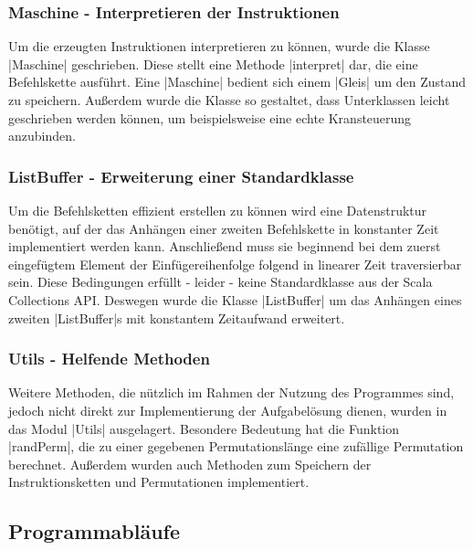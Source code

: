 \subsubsection{Maschine - Interpretieren der Instruktionen}
Um die erzeugten Instruktionen interpretieren zu können, wurde die Klasse |Maschine| geschrieben.
Diese stellt eine Methode |interpret| dar, die eine Befehlskette ausführt.
Eine |Maschine| bedient sich einem |Gleis| um den Zustand zu speichern.
Außerdem wurde die Klasse so gestaltet, dass Unterklassen leicht geschrieben werden können, um beispielsweise eine echte Kransteuerung anzubinden.

\subsubsection{ListBuffer - Erweiterung einer Standardklasse}
Um die Befehlsketten effizient erstellen zu können wird eine Datenstruktur benötigt,
auf der das Anhängen einer zweiten Befehlskette in konstanter Zeit implementiert werden kann.
Anschließend muss sie beginnend bei dem zuerst eingefügtem Element der Einfügereihenfolge folgend in linearer Zeit traversierbar sein.
Diese Bedingungen erfüllt - leider - keine Standardklasse aus der Scala Collections API.
Deswegen wurde die Klasse |ListBuffer| um das Anhängen eines zweiten |ListBuffer|s mit konstantem Zeitaufwand erweitert.

\subsubsection{Utils - Helfende Methoden}
Weitere Methoden, die nützlich im Rahmen der Nutzung des Programmes sind, jedoch nicht direkt zur Implementierung der Aufgabelösung dienen,
wurden in das Modul |Utils| ausgelagert. Besondere Bedeutung hat die Funktion |randPerm|, die zu einer gegebenen Permutationslänge
eine zufällige Permutation berechnet. %
Außerdem wurden auch Methoden zum Speichern der Instruktionsketten und Permutationen implementiert.

\newpage
\subsection{Programmabläufe}
